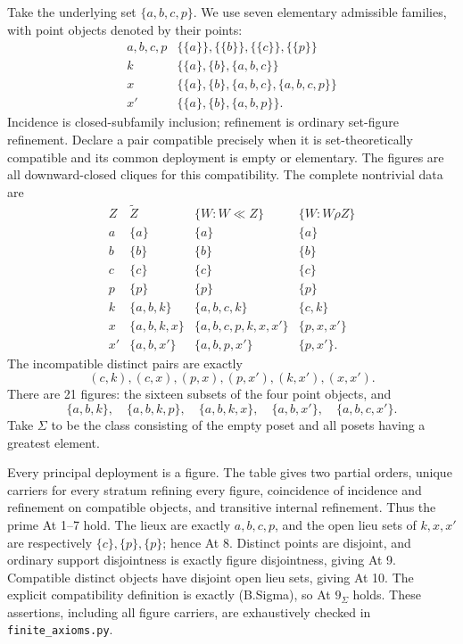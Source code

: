 \begin{counterexample}
\label{SA21-B-Sigma-counter}
Take the underlying set \(\{a,b,c,p\}\). We use seven elementary
admissible families, with point objects denoted by their points:
\[
 \begin{array}{c|l}
 a,b,c,p & \{\{a\}\},\{\{b\}\},\{\{c\}\},\{\{p\}\}\\
 k & \{\{a\},\{b\},\{a,b,c\}\}\\
 x & \{\{a\},\{b\},\{a,b,c\},\{a,b,c,p\}\}\\
 x' & \{\{a\},\{b\},\{a,b,p\}\}.
 \end{array}
\]
Incidence is closed-subfamily inclusion; refinement is ordinary
set-figure refinement. Declare a pair compatible precisely when
it is set-theoretically compatible and its common deployment is
empty or elementary. The figures are all downward-closed cliques
for this compatibility. The complete nontrivial data are
\[
\begin{array}{c|c|c|c}
 Z&\widetilde Z&\{W:W\ll Z\}&\{W:W\rho Z\}\\ \hline
 a&\{a\}&\{a\}&\{a\}\\
 b&\{b\}&\{b\}&\{b\}\\
 c&\{c\}&\{c\}&\{c\}\\
 p&\{p\}&\{p\}&\{p\}\\
 k&\{a,b,k\}&\{a,b,c,k\}&\{c,k\}\\
 x&\{a,b,k,x\}&\{a,b,c,p,k,x,x'\}&\{p,x,x'\}\\
 x'&\{a,b,x'\}&\{a,b,p,x'\}&\{p,x'\}.
\end{array}
\]
The incompatible distinct pairs are exactly
\[
 (c,k),(c,x),(p,x),(p,x'),(k,x'),(x,x').
\]
There are 21 figures: the sixteen subsets of the four point objects,
and
\[
 \{a,b,k\},\quad\{a,b,k,p\},\quad\{a,b,k,x\},\quad
 \{a,b,x'\},\quad\{a,b,c,x'\}.
\]
Take \(\Sigma\) to be the class consisting of the empty poset and
all posets having a greatest element.

Every principal deployment is a figure. The table gives two partial
orders, unique carriers for every stratum refining every figure,
coincidence of incidence and refinement on compatible objects, and
transitive internal refinement. Thus the prime At 1--7 hold.
The lieux are exactly \(a,b,c,p\), and the open lieu sets of
\(k,x,x'\) are respectively \(\{c\},\{p\},\{p\}\); hence At 8.
Distinct points are disjoint, and ordinary support disjointness is
exactly figure disjointness, giving At 9. Compatible distinct
objects have disjoint open lieu sets, giving At 10. The explicit
compatibility definition is exactly (B.Sigma), so At \(9_\Sigma\)
holds. These assertions, including all figure carriers, are
exhaustively checked in \texttt{finite\_axioms.py}.


\end{counterexample}
